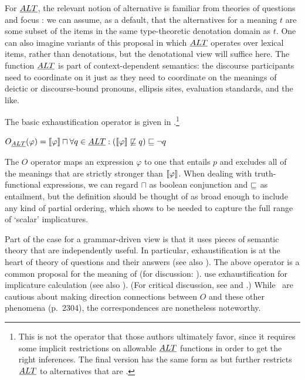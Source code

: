 \documentclass{article}
\begin{document}
For $\emph{ALT}$, the relevant notion of alternative is familiar from
theories of questions and focus \citep{Groenendijk84,Rooth85,Rooth92}:
we can assume, as a default, that the alternatives for a meaning $t$
are some subset of the items in the same type-theoretic denotation
domain as $t$.  One can also imagine variants of this proposal in
which $\emph{ALT}$ operates over lexical items, rather than denotations, but
the denotational view will suffice here.  The function $\emph{ALT}$ is part
of context-dependent semantics: the discourse participants need to
coordinate on it just as they need to coordinate on the meanings of
deictic or discourse-bound pronouns, ellipsis sites, evaluation
standards, and the like.

The basic exhaustification operator is given in 
\citep{Spector:2007,Fox:2007,Fox:2009,Magri:2009,ChierchiaFoxSpector08}.\footnote{This
  is not the operator that those authors ultimately favor, since it
  requires some implicit restrictions on allowable $\emph{ALT}$ functions in
  order to get the right inferences.  The final version has the same
  form as  but further restricts $\emph{ALT}$ to alternatives that
  are .}
%
\begin{examples}
\item\label{def:O}
  $O_{\emph{ALT}}(\varphi) = 
  \llbracket\varphi\rrbracket \sqcap 
  \forall q \in \emph{ALT} : (\llbracket\varphi\rrbracket \not\sqsubseteq q) \sqsubseteq \neg q$
\end{examples}
%
The $O$ operator maps an expression $\varphi$ to one that entails $p$
and excludes all of the meanings that are strictly stronger than
$\llbracket\varphi\rrbracket$. When dealing with truth-functional expressions, we
can regard $\sqcap$ as boolean conjunction and $\sqsubseteq$ as
entailment, but the definition should be thought of as broad enough to
include any kind of partial ordering, which 
shows to be needed to capture the full range of `scalar' implicatures.

Part of the case for a grammar-driven view is that it uses pieces of
semantic theory that are independently useful. In particular,
exhaustification is at the heart of  theory
of questions and their answers (see also
\citealt{JohnMcCarthy80}). The above operator is a common proposal for
the meaning of  (for discussion:
\citealt{Rooth96,Buring01,BeaverClark08}).  \citet{SchulzVanRooij06}
use exhaustification for implicature calculation (see also
\citealt{deJagerVanRooij07}).  (For critical discussion, see
\citealt{Alonso-Ovalle:2008} and \citealt{Gajewski:2012}.) While \CFS\
are cautious about making direction connections between $O$ and these
other phenomena (p.~2304), the correspondences are nonetheless
noteworthy.
\end{document}

